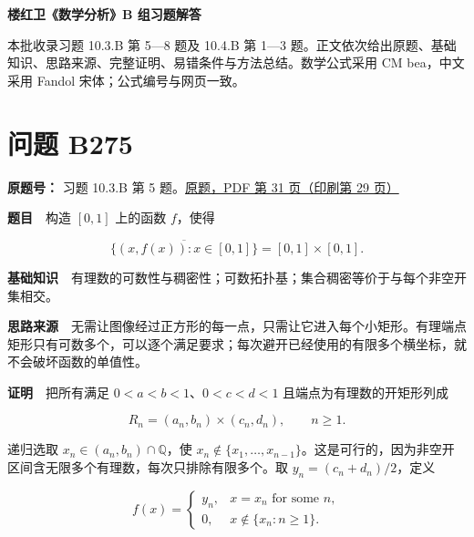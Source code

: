 \documentclass[11pt,a4paper]{article}
\begin{document}
\begin{center}
{\Large\bfseries 楼红卫《数学分析》B 组习题解答\par}
\vspace{7pt}{\large 第四十批\quad B275—B281\par}
\vspace{5pt}{稠密图像、Hardy 不等式与振荡积分\par}
\end{center}
本批收录习题 10.3.B 第 5—8 题及 10.4.B 第 1—3 题。正文依次给出原题、基础知识、思路来源、完整证明、易错条件与方法总结。数学公式采用 CM bea，中文采用 Fandol 宋体；公式编号与网页一致。
\begingroup\setlength{\parskip}{0pt}\tableofcontents\endgroup

\section{问题 B275}\label{ux95eeux9898-b275}

\textbf{原题号：} 习题 10.3.B 第 5
题。\href{https://zj139.github.io/math-notes/files/problems/楼分析习题-v2.pdf\#page=31}{原题，PDF
第 31 页（印刷第 29 页）}

\textbf{题目}　构造 \([0,1]\) 上的函数 \(f\)，使得

\begin{equation}
\overline{\{(x,f(x)):x\in[0,1]\}}=[0,1]\times[0,1].
\tag{1}
\end{equation}

\textbf{基础知识}　有理数的可数性与稠密性；可数拓扑基；集合稠密等价于与每个非空开集相交。

\textbf{思路来源}　无需让图像经过正方形的每一点，只需让它进入每个小矩形。有理端点矩形只有可数多个，可以逐个满足要求；每次避开已经使用的有限多个横坐标，就不会破坏函数的单值性。

\textbf{证明}　把所有满足 \(0<a<b<1\)、\(0<c<d<1\)
且端点为有理数的开矩形列成

\begin{equation}
R_n=(a_n,b_n)\times(c_n,d_n),\qquad n\ge1.
\tag{2}
\end{equation}

递归选取 \(x_n\in(a_n,b_n)\cap\mathbb Q\)，使
\(x_n\notin\{x_1,\ldots,x_{n-1}\}\)。这是可行的，因为非空开区间含无限多个有理数，每次只排除有限多个。取
\(y_n=(c_n+d_n)/2\)，定义

\begin{equation}
f(x)=
\begin{cases}
y_n,&x=x_n\text{ for some }n,\\
0,&x\notin\{x_n:n\ge1\}.
\end{cases}
\tag{3}
\end{equation}
\end{document}
